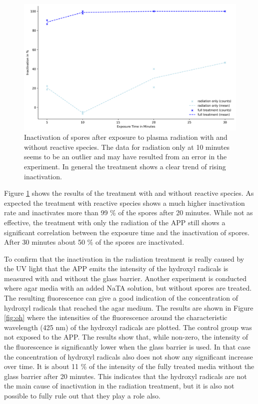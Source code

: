 \begin{figure}
    \centering
    \includegraphics[width=.8\textwidth]{images/Treatment.png}
    \caption[Inactivation of spores after exposure to plasma]{Inactivation of spores after exposure to plasma radiation with and without reactive species. The data for radiation only at 10 minutes seems to be an outlier and may have resulted from an error in the experiment. In general the treatment shows a clear trend of rising inactivation.}
    \label{fig:treatment}
\end{figure}

Figure \ref{fig:treatment} shows the results of the treatment with and without reactive species. As expected the treatment with reactive species shows a much higher inactivation rate and inactivates more than 99 \% of the spores after 20 minutes. While not as effective, the treatment with only the radiation of the APP still shows a significant correlation between the exposure time and the inactivation of spores. After 30 minutes about 50 \% of the spores are inactivated.

To confirm that the inactivation in the radiation treatment is really caused by the UV light that the APP emits the intensity of the hydroxyl radicals is measured with and without the glass barrier. Another experiment is conducted where agar media with an added NaTA solution, but without spores are treated. The resulting fluorescence can give a good indication of the concentration of hydroxyl radicals that reached the agar medium. The results are shown in Figure \ref{fig:oh} where the intensities of the fluorescence around the characteristic wavelength (425 nm) of the hydroxyl radicals are plotted. The control group was not exposed to the APP. The results show that, while non-zero, the intensity of the fluorescence is significantly lower when the glass barrier is used. In that case the concentration of hydroxyl radicals also does not show any significant increase over time. It is about 11 \% of the intensity of the fully treated media without the glass barrier after 20 minutes. This indicates that the hydroxyl radicals are not the main cause of inactivation in the radiation treatment, but it is also not possible to fully rule out that they play a role also.


